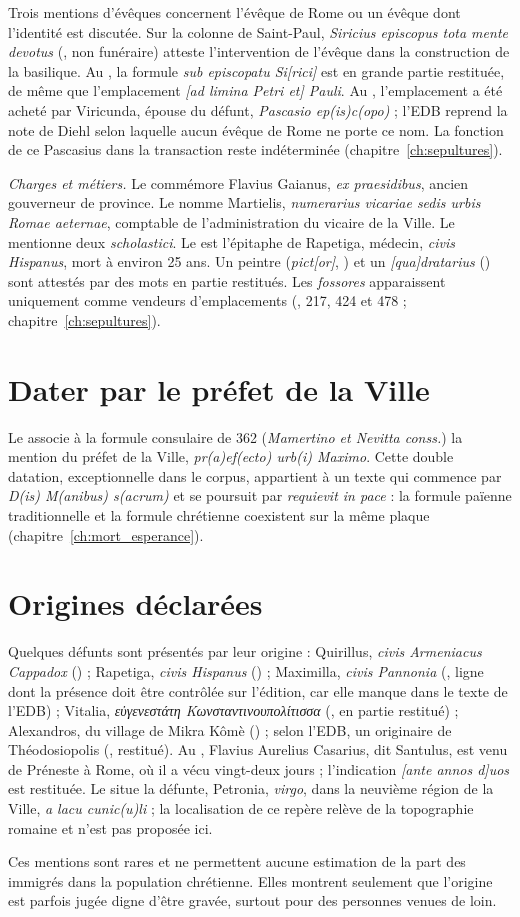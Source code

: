 Trois mentions d’évêques concernent l’évêque de Rome ou un évêque dont l’identité est discutée. Sur la colonne de Saint-Paul, \emph{Siricius episcopus tota mente devotus} (, non funéraire) atteste l’intervention de l’évêque dans la construction de la basilique. Au , la formule \emph{sub episcopatu Si[rici]} est en grande partie restituée, de même que l’emplacement \emph{[ad limina Petri et] Pauli}. Au , l’emplacement a été acheté par Viricunda, épouse du défunt, \emph{Pascasio ep(is)c(opo)} ; l’EDB reprend la note de Diehl selon laquelle aucun évêque de Rome ne porte ce nom. La fonction de ce Pascasius dans la transaction reste indéterminée (chapitre~\ref{ch:sepultures}).

\emph{Charges et métiers.} Le  commémore Flavius Gaianus, \emph{ex praesidibus}, ancien gouverneur de province. Le  nomme Martielis, \emph{numerarius vicariae sedis urbis Romae aeternae}, comptable de l’administration du vicaire de la Ville. Le  mentionne deux \emph{scholastici}. Le  est l’épitaphe de Rapetiga, médecin, \emph{civis Hispanus}, mort à environ 25 ans. Un peintre (\emph{pict[or]}, ) et un \emph{[qua]dratarius} () sont attestés par des mots en partie restitués. Les \emph{fossores} apparaissent uniquement comme vendeurs d’emplacements (, 217, 424 et 478 ; chapitre~\ref{ch:sepultures}).

\section{Dater par le préfet de la Ville}

Le  associe à la formule consulaire de 362 (\emph{Mamertino et Nevitta conss.}) la mention du préfet de la Ville, \emph{pr(a)ef(ecto) urb(i) Maximo}. Cette double datation, exceptionnelle dans le corpus, appartient à un texte qui commence par \emph{D(is) M(anibus) s(acrum)} et se poursuit par \emph{requievit in pace} : la formule païenne traditionnelle et la formule chrétienne coexistent sur la même plaque (chapitre~\ref{ch:mort_esperance}).

\section{Origines déclarées}

Quelques défunts sont présentés par leur origine : Quirillus, \emph{civis Armeniacus Cappadox} () ; Rapetiga, \emph{civis Hispanus} () ; Maximilla, \emph{civis Pannonia} (, ligne dont la présence doit être contrôlée sur l’édition, car elle manque dans le texte de l’EDB) ; Vitalia, \emph{εὐγενεστάτη Κωνσταντινουπολίτισσα} (, en partie restitué) ; Alexandros, du village de Mikra Kômè () ; selon l’EDB, un originaire de Théodosiopolis (, restitué). Au , Flavius Aurelius Casarius, dit Santulus, est venu de Préneste à Rome, où il a vécu vingt-deux jours ; l’indication \emph{[ante annos d]uos} est restituée. Le  situe la défunte, Petronia, \emph{virgo}, dans la neuvième région de la Ville, \emph{a lacu cunic(u)li} ; la localisation de ce repère relève de la topographie romaine et n’est pas proposée ici.

Ces mentions sont rares et ne permettent aucune estimation de la part des immigrés dans la population chrétienne. Elles montrent seulement que l’origine est parfois jugée digne d’être gravée, surtout pour des personnes venues de loin.
